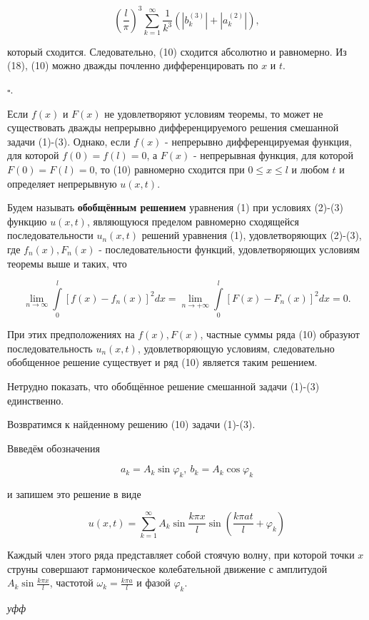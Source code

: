 \[
	\left( \frac{l}{\pi} \right)^3 \sum_{k=1}^\infty \frac{1}{k^3} \left( \left| b_k^{(3)} \right| + \left| a_k^{(2)} \right| \right),
\]

который сходится. Следовательно, (10) сходится абсолютно и равномерно. Из (18), (10) можно дважды почленно дифференцировать по $x$ и $t$.

$\square$.

Если $f(x)$ и $F(x)$ не удовлетворяют условиям теоремы, то может не существовать дважды непрерывно дифференцируемого решения смешанной задачи (1)-(3). Однако, если $f(x)$ - непрерывно дифференцируемая функция, для которой $f(0) = f(l) = 0$, а $F(x)$ - непрерывная функция, для которой $F(0) = F(l) = 0$, то (10) равномерно сходится при $0 \le x \le l$ и любом $t$ и определяет непрерывную $u(x, t)$.

Будем называть \textbf{обобщённым решением} уравнения (1) при условиях (2)-(3) функцию $u(x, t)$, являющуюся пределом равномерно сходящейся последовательности $u_n (x,t)$ решений уравнения (1), удовлетворяющих (2)-(3), где $f_n(x), F_n(x)$ - последовательности функций, удовлетворяющих условиям теоремы выше и таких, что

\[
	\lim\limits_{n \to \infty} \int\limits_0^l \left[ f(x) - f_n (x) \right]^2 dx = \lim\limits_{n \to +\infty} \int\limits_0^l \left[ F(x) - F_n (x) \right]^2 dx = 0.
\]

При этих предположениях на $f(x), F(x)$, частные суммы ряда (10) образуют последовательность $u_n(x, t)$, удовлетворяющую условиям, следовательно обобщенное решение существует и ряд (10) является таким решением.

Нетрудно показать, что обобщённое решение смешанной задачи (1)-(3) единственно.

Возвратимся к найденному решению (10) задачи (1)-(3).

Ввведём обозначения

\[
	a_k = A_k \sin \varphi_k, ~ b_k = A_k \cos \varphi_k
\]

и запишем это решение в виде

\[
	u(x, t) = \sum_{k=1}^\infty A_k \sin \frac{k \pi x}{l} \sin \left( \frac{k \pi at}{l} + \varphi_k \right) \tag{20}
\]

Каждый член этого ряда представляет собой стоячую волну, при которой точки $x$ струны совершают гармоническое колебательной движение с амплитудой $A_k \sin \frac{k \pi x}{l}$, частотой $\omega_k = \frac{k \pi a}{l}$ и фазой $\varphi_k$.

\textit{уфф}

